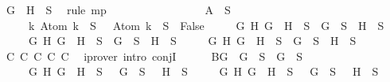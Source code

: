 \begin{isabellebody}
\ {\isacartoucheopen}\isactrlbold {\isasymnot}{\isacharparenleft}G\ \isactrlbold {\isasymrightarrow}\ H{\isacharparenright}\ {\isasymin}\ S{\isacartoucheclose}\ \isamarkupfalse%
\ {\isacharparenleft}rule\ mp{\isacharparenright}\isanewline
\ \ \ \ \ \ \isamarkupfalse%
\isanewline
\ \ \ \ \isamarkupfalse%
\isanewline
\ \ \ \ \isamarkupfalse%
\ A{\isacharcolon}{\isachardoublequoteopen}{\isasymbottom}\ {\isasymnotin}\ S\isanewline
\ \ \ \ {\isasymand}\ {\isacharparenleft}{\isasymforall}k{\isachardot}\ Atom\ k\ {\isasymin}\ S\ {\isasymlongrightarrow}\ \isactrlbold {\isasymnot}\ {\isacharparenleft}Atom\ k{\isacharparenright}\ {\isasymin}\ S\ {\isasymlongrightarrow}\ False{\isacharparenright}\isanewline
\ \ \ \ {\isasymand}\ {\isacharparenleft}{\isasymforall}G\ H{\isachardot}\ G\ \isactrlbold {\isasymand}\ H\ {\isasymin}\ S\ {\isasymlongrightarrow}\ G\ {\isasymin}\ S\ {\isasymand}\ H\ {\isasymin}\ S{\isacharparenright}\isanewline
\ \ \ \ {\isasymand}\ {\isacharparenleft}{\isasymforall}G\ H{\isachardot}\ G\ \isactrlbold {\isasymor}\ H\ {\isasymin}\ S\ {\isasymlongrightarrow}\ G\ {\isasymin}\ S\ {\isasymor}\ H\ {\isasymin}\ S{\isacharparenright}\isanewline
\ \ \ \ {\isasymand}\ {\isacharparenleft}{\isasymforall}G\ H{\isachardot}\ G\ \isactrlbold {\isasymrightarrow}\ H\ {\isasymin}\ S\ {\isasymlongrightarrow}\ \isactrlbold {\isasymnot}G\ {\isasymin}\ S\ {\isasymor}\ H\ {\isasymin}\ S{\isacharparenright}{\isachardoublequoteclose}\isanewline
\ \ \ \ \ \ \isamarkupfalse%
\ C{}\ C{}\ C{}\ C{}\ C{}\ \isamarkupfalse%
\ {\isacharparenleft}iprover\ intro{\isacharcolon}\ conjI{\isacharparenright}\isanewline
\ \ \ \ \isamarkupfalse%
\ B{\isacharcolon}{\isachardoublequoteopen}{\isacharparenleft}{\isasymforall}G{\isachardot}\ \isactrlbold {\isasymnot}\ {\isacharparenleft}\isactrlbold {\isasymnot}G{\isacharparenright}\ {\isasymin}\ S\ {\isasymlongrightarrow}\ G\ {\isasymin}\ S{\isacharparenright}\isanewline
\ \ \ \ {\isasymand}\ {\isacharparenleft}{\isasymforall}G\ H{\isachardot}\ \isactrlbold {\isasymnot}{\isacharparenleft}G\ \isactrlbold {\isasymand}\ H{\isacharparenright}\ {\isasymin}\ S\ {\isasymlongrightarrow}\ \isactrlbold {\isasymnot}\ G\ {\isasymin}\ S\ {\isasymor}\ \isactrlbold {\isasymnot}\ H\ {\isasymin}\ S{\isacharparenright}\isanewline
\ \ \ \ {\isasymand}\ {\isacharparenleft}{\isasymforall}G\ H{\isachardot}\ \isactrlbold {\isasymnot}{\isacharparenleft}G\ \isactrlbold {\isasymor}\ H{\isacharparenright}\ {\isasymin}\ S\ {\isasymlongrightarrow}\ \isactrlbold {\isasymnot}\ G\ {\isasymin}\ S\ {\isasymand}\ \isactrlbold {\isasymnot}\ H\ {\isasymin}\ S{\isacharparenright}\isanewline

\end{isabellebody}
